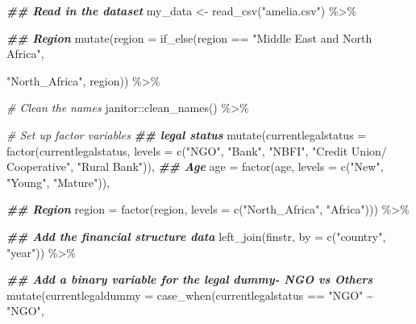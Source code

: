 \documentclass[a4paper,nobind]{templates/ociamthesis}
\newenvironment{Shaded}{\begin{snugshade}}{\end{snugshade}}
\newcommand{\AttributeTok}[1]{\textcolor[rgb]{0.77,0.63,0.00}{#1}}
\newcommand{\CommentTok}[1]{\textcolor[rgb]{0.56,0.35,0.01}{\textit{#1}}}
\newcommand{\DocumentationTok}[1]{\textcolor[rgb]{0.56,0.35,0.01}{\textbf{\textit{#1}}}}
\newcommand{\FunctionTok}[1]{\textcolor[rgb]{0.00,0.00,0.00}{#1}}
\newcommand{\NormalTok}[1]{#1}
\newcommand{\OtherTok}[1]{\textcolor[rgb]{0.56,0.35,0.01}{#1}}
\newcommand{\SpecialCharTok}[1]{\textcolor[rgb]{0.00,0.00,0.00}{#1}}
\newcommand{\StringTok}[1]{\textcolor[rgb]{0.31,0.60,0.02}{#1}}
\renewenvironment{Shaded}
{
  \vspace{10pt}%
  \begin{snugshade}%
}{%
  \end{snugshade}%
  \vspace{8pt}%
}
\begin{document}
\begin{Shaded}
\begin{Highlighting}[]
\DocumentationTok{\#\# Read in the dataset }
\NormalTok{my\_data }\OtherTok{\textless{}{-}} \FunctionTok{read\_csv}\NormalTok{(}\StringTok{"amelia.csv"}\NormalTok{) }\SpecialCharTok{\%\textgreater{}\%} 

\DocumentationTok{\#\# Region}
\FunctionTok{mutate}\NormalTok{(}\AttributeTok{region =} \FunctionTok{if\_else}\NormalTok{(region }\SpecialCharTok{==} \StringTok{"Middle East and North Africa"}\NormalTok{, }
                        
                        \StringTok{"North\_Africa"}\NormalTok{, region)) }\SpecialCharTok{\%\textgreater{}\%} 

\CommentTok{\# Clean the names }
\NormalTok{janitor}\SpecialCharTok{::}\FunctionTok{clean\_names}\NormalTok{() }\SpecialCharTok{\%\textgreater{}\%} 
  
\CommentTok{\# Set up factor variables }
\DocumentationTok{\#\# legal status }
\FunctionTok{mutate}\NormalTok{(}\AttributeTok{currentlegalstatus =} \FunctionTok{factor}\NormalTok{(currentlegalstatus, }
                           \AttributeTok{levels =} \FunctionTok{c}\NormalTok{(}\StringTok{"NGO"}\NormalTok{, }\StringTok{"Bank"}\NormalTok{, }\StringTok{"NBFI"}\NormalTok{, }
                            \StringTok{"Credit Union/ Cooperative"}\NormalTok{, }
                            \StringTok{"Rural Bank"}\NormalTok{)), }
      \DocumentationTok{\#\# Age}
      \AttributeTok{age =} \FunctionTok{factor}\NormalTok{(age, }\AttributeTok{levels =} \FunctionTok{c}\NormalTok{(}\StringTok{"New"}\NormalTok{, }\StringTok{"Young"}\NormalTok{, }\StringTok{"Mature"}\NormalTok{)),}
       
      \DocumentationTok{\#\# Region }
      \AttributeTok{region =} \FunctionTok{factor}\NormalTok{(region, }\AttributeTok{levels =} \FunctionTok{c}\NormalTok{(}\StringTok{"North\_Africa"}\NormalTok{, }\StringTok{"Africa"}\NormalTok{))) }\SpecialCharTok{\%\textgreater{}\%} 
  
      \DocumentationTok{\#\# Add the financial structure data     }
      \FunctionTok{left\_join}\NormalTok{(finstr, }\AttributeTok{by =} \FunctionTok{c}\NormalTok{(}\StringTok{"country"}\NormalTok{, }\StringTok{"year"}\NormalTok{)) }\SpecialCharTok{\%\textgreater{}\%} 
  
      \DocumentationTok{\#\# Add a binary variable for the legal dummy{-} NGO vs Others}
      \FunctionTok{mutate}\NormalTok{(}\AttributeTok{currentlegaldummy =} \FunctionTok{case\_when}\NormalTok{(currentlegalstatus }\SpecialCharTok{==} \StringTok{"NGO"} \SpecialCharTok{\textasciitilde{}} \StringTok{"NGO"}\NormalTok{,}
                                           

\end{Highlighting}
\end{Shaded}
\end{document}
